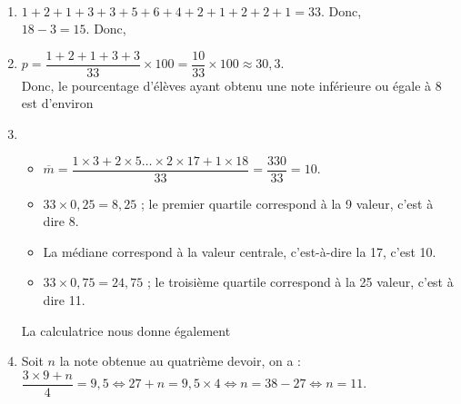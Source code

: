 \ \\ [-5mm]
\begin{enumerate}
      \item $1+2+1+3+3+5+6+4+2+1+2+2+1 =33$. Donc,  \\
      $18-3 =15$. Donc, 
      \smallskip
      \item $p =\dfrac{1+2+1+3+3}{33}\times100 =\dfrac{10}{33}\times100 \approx30,3$. \\ [1mm]
      Donc, le pourcentage d'élèves ayant obtenu une note inférieure ou égale à 8 est d'environ  \\
      \item
      \begin{itemize}
         \item $\overline{m} =\dfrac{1\times3+2\times5\dots\times2\times17+1\times18}{33} =\dfrac{330}{33} =10$.
         \item $33\times0,25 =8,25$ ; le premier quartile correspond à la 9 valeur, c'est à dire 8.
         \smallskip
         \item La médiane correspond à la valeur centrale, c'est-à-dire la 17, c'est 10.
         \item $33\times0,75 =24,75$ ; le troisième quartile correspond à la 25 valeur, c'est à dire 11.
         \smallskip
      \end{itemize}
      La calculatrice nous donne également  \\
      \item Soit $n$ la note obtenue au quatrième devoir, on a  : \\
      $\dfrac{3\times9+n}{4} =9,5 \iff 27+n =9,5\times4 \iff n=38-27\iff n=11$. \\ [1mm]
  \end{enumerate}
